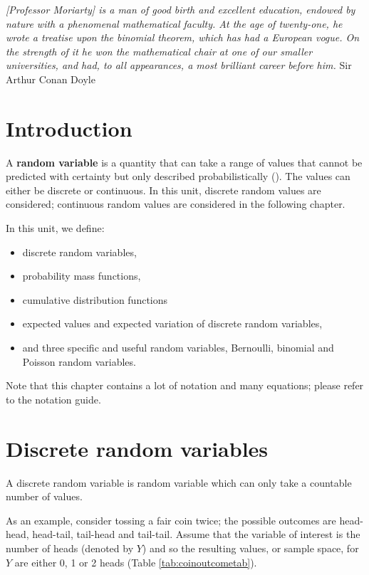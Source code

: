 \documentclass[
  oneside]{krantz}
\begin{document}
\emph{{[}Professor Moriarty{]} is a man of good birth and excellent education, endowed by nature with a phenomenal mathematical faculty. At the age of twenty-one, he wrote a treatise upon the binomial theorem, which has had a European vogue. On the strength of it he won the mathematical chair at one of our smaller universities, and had, to all appearances, a most brilliant career before him.} Sir Arthur Conan Doyle \citeyearpar{Doyle1894}

\hypertarget{INTdiscrv}{%
\section{Introduction}\label{INTdiscrv}}

A \textbf{random variable} is a quantity that can take a range of values that cannot be predicted with certainty but only described probabilistically (\citet{BorowskiBorwein}). The values can either be discrete or continuous. In this unit, discrete random values are considered; continuous random values are considered in the following chapter.

In this unit, we define:

\begin{itemize}
\item
  discrete random variables,
\item
  probability mass functions,
\item
  cumulative distribution functions
\item
  expected values and expected variation of discrete random variables,
\item
  and three specific and useful random variables, Bernoulli, binomial and Poisson random variables.
\end{itemize}

Note that this chapter contains a lot of notation and many equations; please refer to the notation guide.

\hypertarget{discrete-random-variables}{%
\section{Discrete random variables}\label{discrete-random-variables}}

A discrete random variable is random variable which can only take a countable number of values.

As an example, consider tossing a fair coin twice; the possible outcomes are head-head, head-tail, tail-head and tail-tail. Assume that the variable of interest is the number of heads (denoted by \(Y\)) and so the resulting values, or sample space, for \(Y\) are either 0, 1 or 2 heads (Table \ref{tab:coinoutcometab}).
\end{document}
